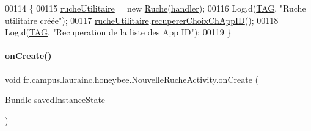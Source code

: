 \begin{DoxyCode}
00114     \{
00115         \hyperlink{classfr_1_1campus_1_1laurainc_1_1honeybee_1_1_nouvelle_ruche_activity_adad53c25187f84fd37af3d2de167529e}{rucheUtilitaire} = \textcolor{keyword}{new} \hyperlink{class_ruche}{Ruche}(\hyperlink{classfr_1_1campus_1_1laurainc_1_1honeybee_1_1_nouvelle_ruche_activity_a71c7cb93b67cfe6c419c3c6f8504bbc0}{handler});
00116         Log.d(\hyperlink{classfr_1_1campus_1_1laurainc_1_1honeybee_1_1_nouvelle_ruche_activity_afa1372bcc0387e18df3877ebe605670d}{TAG}, \textcolor{stringliteral}{"Ruche utilitaire créée"});
00117         \hyperlink{classfr_1_1campus_1_1laurainc_1_1honeybee_1_1_nouvelle_ruche_activity_adad53c25187f84fd37af3d2de167529e}{rucheUtilitaire}.\hyperlink{classfr_1_1campus_1_1laurainc_1_1honeybee_1_1_ruche_ade5d681bd0a29d84e0d069169b10a38b}{recupererChoixChAppID}();
00118         Log.d(\hyperlink{classfr_1_1campus_1_1laurainc_1_1honeybee_1_1_nouvelle_ruche_activity_afa1372bcc0387e18df3877ebe605670d}{TAG}, \textcolor{stringliteral}{"Recuperation de la liste des App ID"});
00119     \}
\end{DoxyCode}
\mbox{\label{classfr_1_1campus_1_1laurainc_1_1honeybee_1_1_nouvelle_ruche_activity_ae97fec78fb0a2e1cc4610182bc71ea0d}} 
\paragraph{\texorpdfstring{on\+Create()}{onCreate()}}
{\footnotesize\ttfamily void fr.\+campus.\+laurainc.\+honeybee.\+Nouvelle\+Ruche\+Activity.\+on\+Create (\begin{DoxyParamCaption}\item[{Bundle}]{saved\+Instance\+State }\end{DoxyParamCaption})\hspace{0.3cm}{\ttfamily [protected]}}



